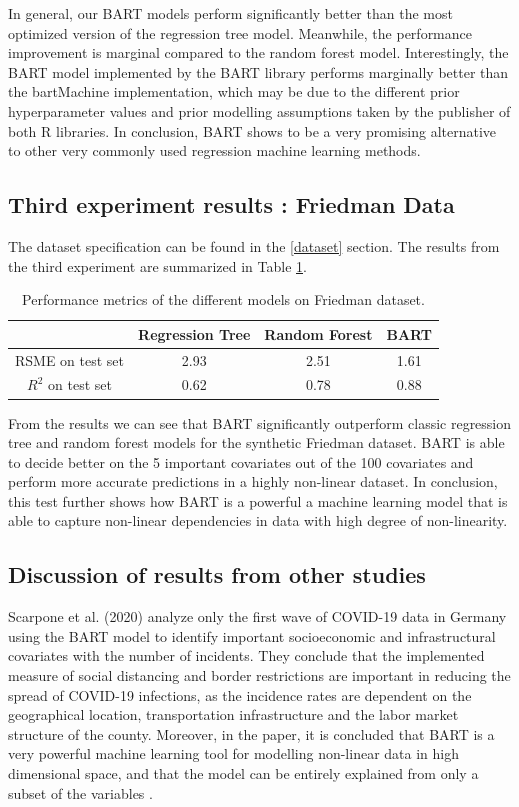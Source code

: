 \documentclass{usiinftr}
\begin{document}
In general, our BART models perform significantly better than the most optimized version of the regression tree model. Meanwhile, the performance improvement is marginal compared to the random forest model. Interestingly, the BART model implemented by the BART library performs marginally better than the bartMachine implementation, which may be due to the different prior hyperparameter values and prior modelling assumptions taken by the publisher of both R libraries. In conclusion, BART shows to be a very promising alternative to other very commonly used regression machine learning methods.

\subsection{Third experiment results : Friedman Data}
The dataset specification can be found in the \ref{dataset} section. The results from the third experiment are summarized in Table \ref{result_table}.

\begin{table} 
\centering \caption{Performance metrics of the different models on Friedman dataset.}
\begin{tabular}{|c|c|c|c|} 
\hline & Regression Tree & Random Forest & BART \\
\hline RSME on test set & 2.93 & 2.51 & 1.61 \\
\hline $R^2$ on test set & 0.62 & 0.78 & 0.88 \\
\hline
\end{tabular}
\label{result_table}
\end{table}

From the results we can see that BART significantly outperform classic regression tree and random forest models for the synthetic Friedman dataset. BART is able to decide better on the 5 important covariates out of the 100 covariates and perform more accurate predictions in a highly non-linear dataset. In conclusion, this test further shows how BART is a powerful a machine learning model that is able to capture non-linear dependencies in data with high degree of non-linearity. 

\subsection{Discussion of results from other studies}
Scarpone et al. (2020) \cite{16} analyze only the first wave of COVID-19 data in Germany using the BART model to identify important socioeconomic and infrastructural covariates with the number of incidents. They conclude that the implemented measure of social distancing and border restrictions are important in reducing the spread of COVID-19 infections, as the incidence rates are dependent on the geographical location, transportation infrastructure and the labor market structure of the county. Moreover, in the paper, it is concluded that BART is a very powerful machine learning tool for modelling non-linear data in high dimensional space, and that the model can be entirely explained from only a subset of the variables \cite{16}.  
\end{document}
